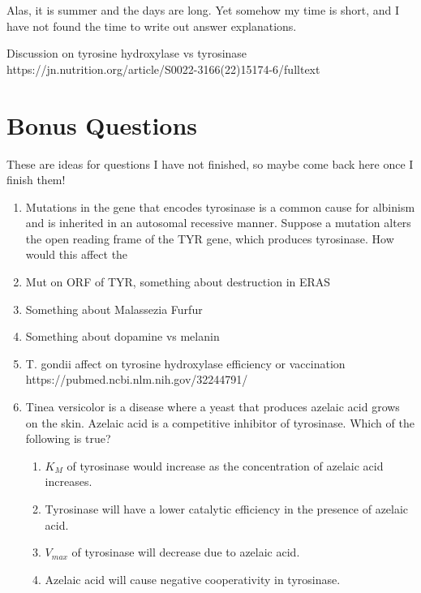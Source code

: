 \documentclass{article}
\begin{document}
Alas, it is summer and the days are long. Yet somehow my time is short, and I have not found the time to write out answer explanations.

Discussion on tyrosine hydroxylase vs tyrosinase https://jn.nutrition.org/article/S0022-3166(22)15174-6/fulltext

\section*{Bonus Questions}

These are ideas for questions I have not finished, so maybe come back here once I finish them!

\begin{enumerate}
    \item Mutations in the gene that encodes tyrosinase is a common cause for albinism and is inherited in an autosomal recessive manner.  Suppose a mutation alters the open reading frame of the TYR gene, which produces tyrosinase. How would this affect the 
    \item Mut on ORF of TYR, something about destruction in ERAS
    \item Something about Malassezia Furfur
    \item Something about dopamine vs melanin
    \item T. gondii affect on tyrosine hydroxylase efficiency or vaccination https://pubmed.ncbi.nlm.nih.gov/32244791/
    \item Tinea versicolor is a disease where a yeast that produces azelaic acid grows on the skin. Azelaic acid is a competitive inhibitor of tyrosinase. Which of the following is true?
    \begin{enumerate}
        \item $K_M$ of tyrosinase would increase as the concentration of azelaic acid increases.
        \item Tyrosinase will have a lower catalytic efficiency in the presence of azelaic acid.
        \item $V_{max}$ of tyrosinase will decrease due to azelaic acid.
        \item Azelaic acid will cause negative cooperativity in tyrosinase.
    \end{enumerate}
\end{enumerate}

\printbibliography
\end{document}
